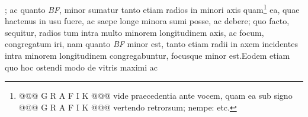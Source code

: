                    ; ac quanto \textit{BF},  minor sumatur tanto etiam radios in minori axis   quam\footnote{@@@ G R A F I K @@@ vide praecedentia  ante vocem, quam ea  sub signo @@@ G R A F I K @@@ vertendo retrorsum;  nempe:  etc.} ea, quae hactenus in usu fuere, ac saepe  longe minora sumi posse, ac debere; quo facto, sequitur,  radios tum intra multo minorem longitudinem axis, ac focum\protect{}, congregatum iri, nam quanto \textit{BF} minor est, tanto  etiam radii in axem incidentes intra minorem longitudinem  congregabuntur, focusque\protect{} minor est.\pend \pstart  Eodem etiam quo hoc ostendi modo de vitris maximi ac 